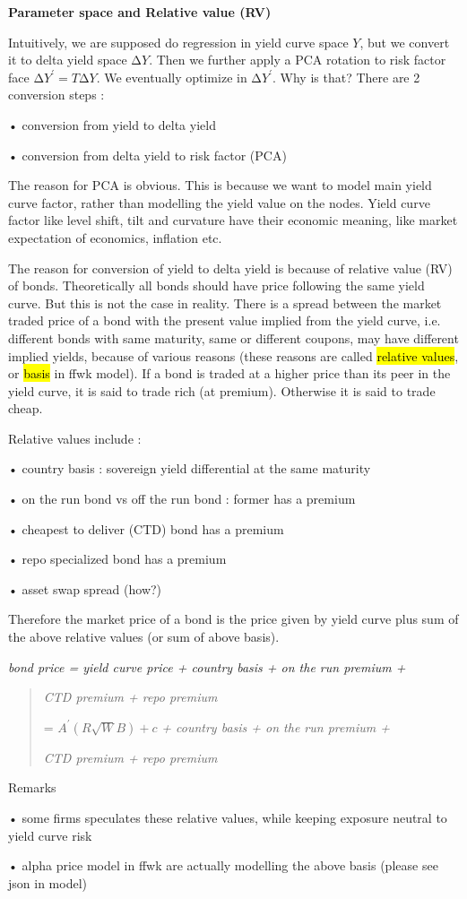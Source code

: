 \textbf{\hfill\break
}

\textbf{Parameter space and Relative value (RV)}

Intuitively, we are supposed do regression in yield curve space \(Y\),
but we convert it to delta yield space \(\mathrm{\Delta}Y\). Then we
further apply a PCA rotation to risk factor face
\(\mathrm{\Delta}Y^{'} = T\mathrm{\Delta}Y\). We eventually optimize in
\(\mathrm{\Delta}Y^{'}\). Why is that? There are 2 conversion steps :

• conversion from yield to delta yield

• conversion from delta yield to risk factor (PCA)

The reason for PCA is obvious. This is because we want to model main
yield curve factor, rather than modelling the yield value on the nodes.
Yield curve factor like level shift, tilt and curvature have their
economic meaning, like market expectation of economics, inflation etc.

The reason for conversion of yield to delta yield is because of relative
value (RV) of bonds. Theoretically all bonds should have price following
the same yield curve. But this is not the case in reality. There is a
spread between the market traded price of a bond with the present value
implied from the yield curve, i.e. different bonds with same maturity,
same or different coupons, may have different implied yields, because of
various reasons (these reasons are called \hl{relative values}, or
\hl{basis} in ffwk model). If a bond is traded at a higher price than
its peer in the yield curve, it is said to trade rich (at premium).
Otherwise it is said to trade cheap.

Relative values include :

• country basis : sovereign yield differential at the same maturity

• on the run bond vs off the run bond : former has a premium

• cheapest to deliver (CTD) bond has a premium

• repo specialized bond has a premium

• asset swap spread (how?)

Therefore the market price of a bond is the price given by yield curve
plus sum of the above relative values (or sum of above basis).

\emph{bond price = yield curve price + country basis + on the run
premium +}

\begin{quote}
\emph{CTD premium + repo premium}

= \(A^{'}(R\sqrt{W}B) + c\) \emph{+ country basis + on the run premium
+}

\emph{CTD premium + repo premium}
\end{quote}

Remarks

• some firms speculates these relative values, while keeping exposure
neutral to yield curve risk

• alpha price model in ffwk are actually modelling the above basis
(please see json in model)
